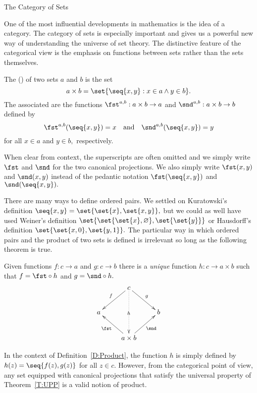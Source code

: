 \begin{unit}{The Category of Sets}

One of the most influential developments in mathematics is the idea of a category.
The category of sets is especially important and gives us a powerful new way of understanding the universe of set theory.
The distinctive feature of the categorical view is the emphasis on functions between sets rather than the sets themselves.



\begin{definition}\label{D:Product}
  The ()  of two sets \(a\) and \(b\) is the set \[a \times b = \set{\seq{x,y} : x \in a \land y \in b}.\]
  The associated  are the functions \(\fst^{a,b}:a \times b \to a\) and \(\snd^{a,b}: a \times b \to b\) defined by \[\fst^{a,b}(\seq{x,y}) = x \quad\mbox{and}\quad \snd^{a,b}(\seq{x,y}) = y\] for all \(x \in a\) and \(y \in b,\) respectively.
\end{definition}

\noindent
When clear from context, the superscripts are often omitted and we simply write \(\fst\) and \(\snd\) for the two canonical projections.
We also simply write \(\fst(x,y)\) and \(\snd(x,y)\) instead of the pedantic notation \(\fst(\seq{x,y})\) and \(\snd(\seq{x,y}).\)

There are many ways to define ordered pairs.
We settled on Kuratowski's definition \(\seq{x,y} = \set{\set{x},\set{x,y}},\) but we could as well have used Weiner's definition \(\set{\set{\set{x},\varnothing},\set{\set{y}}}\) or Hausdorff's definition \(\set{\set{x,0},\set{y,1}}.\)
The particular way in which ordered pairs and the product of two sets is defined is irrelevant so long as the following theorem is true.

\begin{theorem}\label{T:UPP}
  Given functions \(f: c \to a\) and \(g: c \to b\) there is a \emph{unique} function \(h: c \to a \times b\) such that \(f = \fst \circ h\) and \(g = \snd \circ h.\)
  \[\xymatrix{
    & c \ar@{.>}[dd]|{h} \ar[dl]_-{f} \ar[dr]^-{g} \\
    a & & b \\
    & a \times b \ar[ul]^-{\fst} \ar[ur]_-{\snd} 
  }\]
\end{theorem}

\noindent
In the context of Definition~\ref{D:Product}, the function \(h\) is simply defined by \(h(z) = \seq{f(z),g(z)}\) for all \(z \in c.\)
However, from the categorical point of view, any set equipped with canonical projections that satisfy the universal property of Theorem~\ref{T:UPP} is a valid notion of product.


\end{unit}
